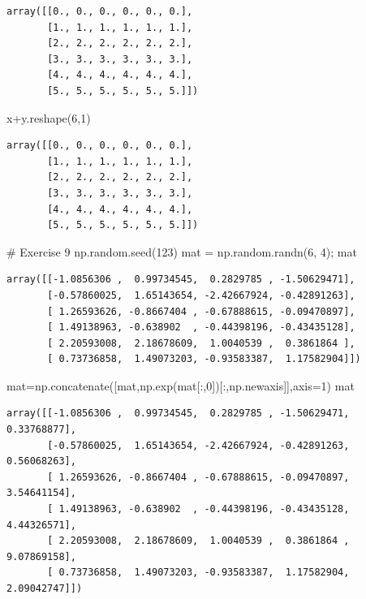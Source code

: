 \documentclass[
  letterpaper,
  DIV=11,
  numbers=noendperiod]{scrreprt}
\newenvironment{Shaded}{\begin{snugshade}}{\end{snugshade}}
\newcommand{\CommentTok}[1]{\textcolor[rgb]{0.37,0.37,0.37}{#1}}
\newcommand{\DecValTok}[1]{\textcolor[rgb]{0.68,0.00,0.00}{#1}}
\newcommand{\NormalTok}[1]{\textcolor[rgb]{0.00,0.23,0.31}{#1}}
\newcommand{\OperatorTok}[1]{\textcolor[rgb]{0.37,0.37,0.37}{#1}}
\begin{document}
\begin{verbatim}
array([[0., 0., 0., 0., 0., 0.],
       [1., 1., 1., 1., 1., 1.],
       [2., 2., 2., 2., 2., 2.],
       [3., 3., 3., 3., 3., 3.],
       [4., 4., 4., 4., 4., 4.],
       [5., 5., 5., 5., 5., 5.]])
\end{verbatim}

\begin{Shaded}
\begin{Highlighting}[]
\NormalTok{x}\OperatorTok{+}\NormalTok{y.reshape(}\DecValTok{6}\NormalTok{,}\DecValTok{1}\NormalTok{)}
\end{Highlighting}
\end{Shaded}

\begin{verbatim}
array([[0., 0., 0., 0., 0., 0.],
       [1., 1., 1., 1., 1., 1.],
       [2., 2., 2., 2., 2., 2.],
       [3., 3., 3., 3., 3., 3.],
       [4., 4., 4., 4., 4., 4.],
       [5., 5., 5., 5., 5., 5.]])
\end{verbatim}

\begin{Shaded}
\begin{Highlighting}[]
\CommentTok{\# Exercise 9}
\NormalTok{np.random.seed(}\DecValTok{123}\NormalTok{)}
\NormalTok{mat }\OperatorTok{=}\NormalTok{ np.random.randn(}\DecValTok{6}\NormalTok{, }\DecValTok{4}\NormalTok{)}\OperatorTok{;}\NormalTok{ mat}
\end{Highlighting}
\end{Shaded}

\begin{verbatim}
array([[-1.0856306 ,  0.99734545,  0.2829785 , -1.50629471],
       [-0.57860025,  1.65143654, -2.42667924, -0.42891263],
       [ 1.26593626, -0.8667404 , -0.67888615, -0.09470897],
       [ 1.49138963, -0.638902  , -0.44398196, -0.43435128],
       [ 2.20593008,  2.18678609,  1.0040539 ,  0.3861864 ],
       [ 0.73736858,  1.49073203, -0.93583387,  1.17582904]])
\end{verbatim}

\begin{Shaded}
\begin{Highlighting}[]
\NormalTok{mat}\OperatorTok{=}\NormalTok{np.concatenate([mat,np.exp(mat[:,}\DecValTok{0}\NormalTok{])[:,np.newaxis]],axis}\OperatorTok{=}\DecValTok{1}\NormalTok{)}
\NormalTok{mat}
\end{Highlighting}
\end{Shaded}

\begin{verbatim}
array([[-1.0856306 ,  0.99734545,  0.2829785 , -1.50629471,  0.33768877],
       [-0.57860025,  1.65143654, -2.42667924, -0.42891263,  0.56068263],
       [ 1.26593626, -0.8667404 , -0.67888615, -0.09470897,  3.54641154],
       [ 1.49138963, -0.638902  , -0.44398196, -0.43435128,  4.44326571],
       [ 2.20593008,  2.18678609,  1.0040539 ,  0.3861864 ,  9.07869158],
       [ 0.73736858,  1.49073203, -0.93583387,  1.17582904,  2.09042747]])
\end{verbatim}
\end{document}
